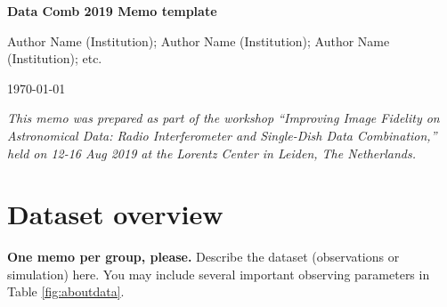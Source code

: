 \documentclass[12pt,a4paper]{article}
\begin{document}
\pagestyle{plain}
 

\begin{center}
{\Large{\bf{  Data Comb 2019 Memo template \\  }}} 

\end{center}
\bigskip

\centerline{Author Name (Institution); Author Name (Institution); Author Name (Institution); etc.}

\centerline{\today}
\bigskip

\noindent \textit{This memo was prepared as part of the workshop ``Improving Image Fidelity on Astronomical Data: Radio Interferometer and Single-Dish Data Combination,'' held on 12-16 Aug 2019 at the Lorentz Center in Leiden, The Netherlands.}

\section{Dataset overview}

\textbf{One memo per group, please.} Describe the dataset (observations or simulation) here.  You may include several important observing parameters in Table \ref{fig:aboutdata}.
\end{document}
